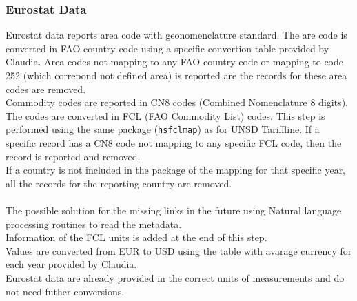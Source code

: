 \documentclass[nojss]{jss}\usepackage[]{graphicx}\usepackage[]{color}
\begin{document}
\subsubsection{Eurostat Data}
Eurostat data reports area code with geonomenclature standard. The are code is converted in FAO country code using a specific convertion table provided by Claudia.  Area codes not mapping to any FAO country code or mapping to code 252 (which correpond not defined area) is reported are the records for these area codes are removed.\\
Commodity codes are reported in CN8 codes (Combined Nomenclature 8 digits). The codes are converted in FCL (FAO Commodity List) codes. This step is performed using the same package ({\tt hsfclmap}) as for UNSD Tariffline.
If a specific record has a CN8 code not mapping to any specific FCL code, then the record is reported and removed.\\
If a country is not included in the package of the mapping for that specific year, all the records for the reporting country are removed.\\\\
The possible solution for the missing links in the future using Natural language processing routines to read the metadata.\\
Information of the FCL units is added at the end of this step.\\
Values are converted from EUR to USD using the table with avarage currency for each year provided by Claudia.\\
Eurostat data are already provided in the correct units of measurements and do not need futher conversions.
\end{document}
